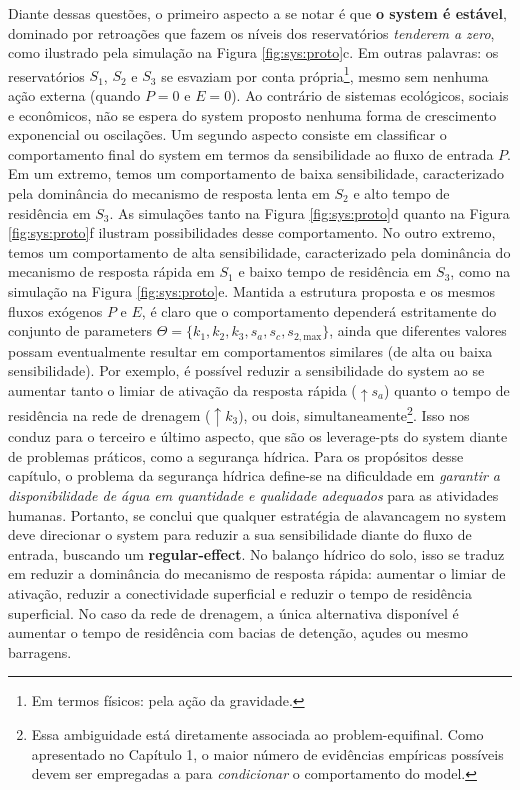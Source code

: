 \documentclass[./main.tex]{subfiles}
\begin{document}
\par Diante dessas questões, o primeiro aspecto a se notar é que \textbf{o \gls{system} é estável}, dominado por retroações que fazem os níveis dos reservatórios \textit{tenderem a zero}, como ilustrado pela simulação na Figura \ref{fig:sys:proto}c. Em outras palavras: os reservatórios $S_1$, $S_2$ e $S_3$ se esvaziam por conta própria\footnote{Em termos físicos: pela ação da gravidade.}, mesmo sem nenhuma ação externa (quando $P=0$ e $E=0$). Ao contrário de sistemas ecológicos, sociais e econômicos, não se espera do \gls{system} proposto nenhuma forma de crescimento exponencial ou oscilações. Um segundo aspecto consiste em classificar o comportamento final do \gls{system} em termos da sensibilidade ao fluxo de entrada $P$. Em um extremo, temos um comportamento de baixa sensibilidade, caracterizado pela dominância do mecanismo de resposta lenta em $S_2$ e alto tempo de residência em $S_3$. As simulações tanto na Figura \ref{fig:sys:proto}d quanto na Figura \ref{fig:sys:proto}f ilustram possibilidades desse comportamento. No outro extremo, temos um comportamento de alta sensibilidade, caracterizado pela dominância do mecanismo de resposta rápida em $S_1$ e baixo tempo de residência em $S_3$, como na simulação na Figura \ref{fig:sys:proto}e. Mantida a estrutura proposta e os mesmos fluxos exógenos $P$ e $E$, é claro que o comportamento dependerá estritamente do conjunto de \gls{parameters} $\Theta = \{k_1, k_2, k_3, s_a, s_c, s_{2, \text{max}}\}$, ainda que diferentes valores possam eventualmente resultar em comportamentos similares (de alta ou baixa sensibilidade). Por exemplo, é possível reduzir a sensibilidade do \gls{system} ao se aumentar tanto o limiar de ativação da resposta rápida ($ \uparrow s_a$) quanto o tempo de residência na rede de drenagem ($ \uparrow k_3$), ou dois, simultaneamente\footnote{Essa ambiguidade está diretamente associada ao \gls{problem-equifinal}. Como apresentado no Capítulo 1, o maior número de evidências empíricas possíveis devem ser empregadas a para \textit{condicionar} o comportamento do \gls{model}.}. Isso nos conduz para o terceiro e último aspecto, que são os \gls{leverage-pts} do \gls{system} diante de problemas práticos, como a segurança hídrica. Para os propósitos desse capítulo, o problema da segurança hídrica define-se na dificuldade em \textit{garantir a disponibilidade de água em quantidade e qualidade adequados} para as atividades humanas. Portanto, se conclui que qualquer estratégia de alavancagem no \gls{system} deve direcionar o \gls{system} para reduzir a sua sensibilidade diante do fluxo de entrada, buscando um \textbf{\gls{regular-effect}}. No balanço hídrico do solo, isso se traduz em reduzir a dominância do mecanismo de resposta rápida: aumentar o limiar de ativação, reduzir a conectividade superficial e reduzir o tempo de residência superficial. No caso da rede de drenagem, a única alternativa disponível é aumentar o tempo de residência com bacias de detenção, açudes ou mesmo barragens. 
\end{document}
